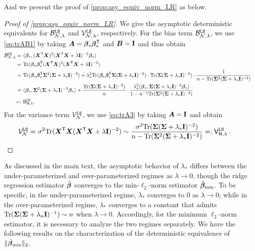 And we present the proof of \cref{prop:asy_equiv_norm_LR} as below.
\begin{proof}[Proof of \cref{prop:asy_equiv_norm_LR}]
We give the asymptotic deterministic equivalents for $\mathcal{B}_{\mathcal{N},\lambda}^{\tt LS}$ and $\mathcal{V}_{\mathcal{N},\lambda}^{\tt LS}$, respectively. For the bias term $\mathcal{B}_{\mathcal{N},\lambda}^{\tt LS}$, we use \cref{eq:trAB1} by taking ${\boldsymbol A} = {\boldsymbol \beta}_*{\boldsymbol \beta}_*^{\mathsf T}$ and ${\boldsymbol B} = {\mathbf I}$ and thus obtain
\[
\begin{aligned}
    \mathcal{B}_{\mathcal{N},\lambda}^{\tt LS} = &~ \langle{\boldsymbol \beta}_*, ({\boldsymbol X}^{\mathsf T}{\boldsymbol X})^2({\boldsymbol X}^{\mathsf T}{\boldsymbol X} + \lambda{\mathbf I})^{-2}{\boldsymbol \beta}_*\rangle\\
    = &~ {\rm Tr}({\boldsymbol \beta}_*{\boldsymbol \beta}_*^{\mathsf T}({\boldsymbol X}^{\mathsf T}{\boldsymbol X})^2({\boldsymbol X}^{\mathsf T}{\boldsymbol X} + \lambda{\mathbf I})^{-2})\\
    \sim &~ {\rm Tr}({\boldsymbol \beta}_*{\boldsymbol \beta}_*^{\mathsf T}{\boldsymbol \Sigma}^2({\boldsymbol \Sigma} + \lambda_*{\mathbf I})^{-2}) + \lambda_*^2 {\rm Tr}({\boldsymbol \beta}_*{\boldsymbol \beta}_*^{\mathsf T}{\boldsymbol \Sigma}({\boldsymbol \Sigma} + \lambda_*{\mathbf I})^{-2}) \cdot {\rm Tr}({\boldsymbol \Sigma}({\boldsymbol \Sigma} + \lambda_*{\mathbf I})^{-2}) \cdot \frac{1}{n-{\rm Tr}({\boldsymbol \Sigma}^2({\boldsymbol \Sigma} + \lambda_*{\mathbf I})^{-2})}\\
    = &~ \langle{\boldsymbol \beta}_*, {\boldsymbol \Sigma}^2({\boldsymbol \Sigma} + \lambda_*{\mathbf I})^{-2}{\boldsymbol \beta}_*\rangle + \frac{{\rm Tr}({\boldsymbol \Sigma}({\boldsymbol \Sigma} + \lambda_*{\mathbf I})^{-2})}{n} \cdot \frac{\lambda_*^2 \langle{\boldsymbol \beta}_*,{\boldsymbol \Sigma}({\boldsymbol \Sigma} + \lambda_*{\mathbf I})^{-2}{\boldsymbol \beta}_*\rangle}{1-n^{-1}{\rm Tr}({\boldsymbol \Sigma}^2({\boldsymbol \Sigma} + \lambda_*{\mathbf I})^{-2})}\\
    =: &~ \mathsf B_{\mathsf N, \lambda}^{\tt LS}\,.
\end{aligned}
\]
For the variance term $\mathcal{V}_{\mathcal{N}}^{\tt LS}$, we use \cref{eq:trA3} by taking ${\boldsymbol A} = {\mathbf I}$ and obtain
\[
\begin{aligned}
    \mathcal{V}_{\mathcal{N}}^{\tt LS} = &~ \sigma^2{\rm Tr}({\boldsymbol X}^{\mathsf T}{\boldsymbol X}({\boldsymbol X}^{\mathsf T}{\boldsymbol X} + \lambda{\mathbf I})^{-2}) \sim \frac{\sigma^2{\rm Tr}({\boldsymbol \Sigma}({\boldsymbol \Sigma} + \lambda_*{\mathbf I})^{-2})}{n - {\rm Tr}({\boldsymbol \Sigma}^2({\boldsymbol \Sigma} + \lambda_*{\mathbf I})^{-2})} =: \mathsf V_{\mathsf N, \lambda}^{\tt LS}\,.
\end{aligned}
\]
\end{proof}

As discussed in the main text, the asymptotic behavior of $\lambda_*$ differs between the under-parameterized and over-parameterized regimes as $\lambda \to 0$, though the ridge regression estimator $\hat{{\boldsymbol \beta}}$ converges to the min-$\ell_2$-norm estimator $\hat{{\boldsymbol \beta}}_{\min}$.
To be specific, in the under-parameterized regime, $\lambda_*$ converges to $0$ as $\lambda \to 0$; while in the over-parameterized regime, $\lambda_*$ converges to a constant that admits ${\rm Tr}({\boldsymbol \Sigma}({\boldsymbol \Sigma} + \lambda_n {\mathbf I})^{-1}) \sim n$ when $\lambda \to 0$. 
Accordingly, for the minimum $\ell_2$-norm estimator, it is necessary to analyze the two regimes separately.
We have the following results on the characterization of the deterministic equivalence of $\| \hat{{\boldsymbol \beta}}_{\min} \|_2$. 

